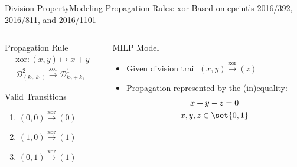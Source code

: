 \begin{frame}{Division Property}{Modeling Propagation Rules: $\mathrm{xor}$}
    \centering
    Based on eprint's \href{https://ia.cr/2016/392}{2016/392}, \href{https://ia.cr/2016/811}{2016/811}, and \href{https://ia.cr/2016/1101}{2016/1101}
    \begin{columns}
        \begin{column}{0.35\textwidth}
            \begin{block}{Propagation Rule}
            \vspace*{-10pt}
            \begin{gather*}
                \mathrm{xor} : (x,y) \mapsto x + y \\
                \mathcal{D}^{2}_{(k_0,k_1)} \stackrel{\mathrm{xor}}{\to} \mathcal{D}^1_{k_0+k_1}
            \end{gather*}
            \end{block}
            \begin{block}{Valid Transitions}
                \begin{enumerate}
                    \item \quad $(0,0) \stackrel{\mathrm{xor}}{\to} (0)$
                    \item \quad $(1,0) \stackrel{\mathrm{xor}}{\to} (1)$
                    \item \quad $(0,1) \stackrel{\mathrm{xor}}{\to} (1)$
                \end{enumerate}
            \end{block}
            \pause
        \end{column}
        \begin{column}{0.575\textwidth}
            \begin{block}{MILP Model}
            \begin{itemize}
                \item Given division trail $(x, y) \stackrel{\mathrm{xor}}{\to} (z)$\\[2pt]
                \item Propagation represented by the (in)equality:
                    \begin{gather*}
                        x + y - z = 0\\
                        x, y, z \in \set{0,1}
                    \end{gather*}
            \end{itemize}
            \end{block}
        \end{column}
    \end{columns}
\end{frame}

